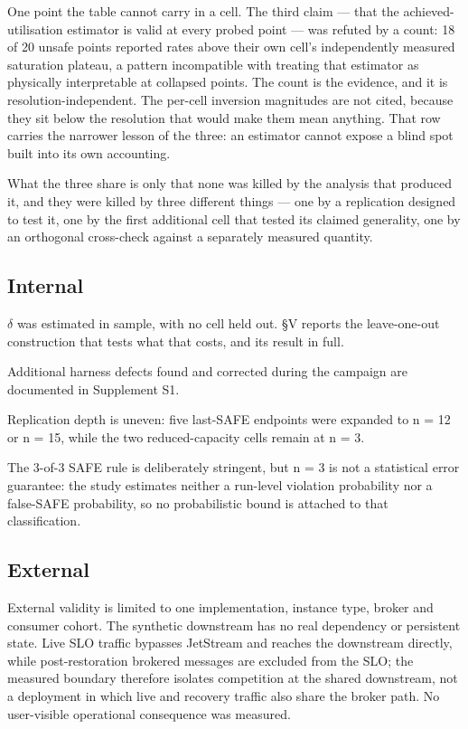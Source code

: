 \documentclass{ieeeaccess}
\begin{document}
One point the table cannot carry in a cell. The third claim --- that the achieved-utilisation estimator is valid at every probed point --- was refuted by a count: 18 of 20 unsafe points reported rates above their own cell's independently measured saturation plateau, a pattern incompatible with treating that estimator as physically interpretable at collapsed points. The count is the evidence, and it is resolution-independent. The per-cell inversion magnitudes are not cited, because they sit below the resolution that would make them mean anything. That row carries the narrower lesson of the three: an estimator cannot expose a blind spot built into its own accounting.

What the three share is only that none was killed by the analysis that produced it, and they were killed by three different things --- one by a replication designed to test it, one by the first additional cell that tested its claimed generality, one by an orthogonal cross-check against a separately measured quantity.

\subsection{Internal}

$\delta$ was estimated in sample, with no cell held out. \S{}V reports the leave-one-out construction that tests what that costs, and its result in full.

Additional harness defects found and corrected during the campaign are documented in Supplement S1.

Replication depth is uneven: five last-SAFE endpoints were expanded to n = 12 or n = 15, while the two reduced-capacity cells remain at n = 3.

The 3-of-3 SAFE rule is deliberately stringent, but n = 3 is not a statistical error guarantee: the study estimates neither a run-level violation probability nor a false-SAFE probability, so no probabilistic bound is attached to that classification.

\subsection{External}

External validity is limited to one implementation, instance type, broker and consumer cohort. The synthetic downstream has no real dependency or persistent state. Live SLO traffic bypasses JetStream and reaches the downstream directly, while post-restoration brokered messages are excluded from the SLO; the measured boundary therefore isolates competition at the shared downstream, not a deployment in which live and recovery traffic also share the broker path. No user-visible operational consequence was measured.
\end{document}

